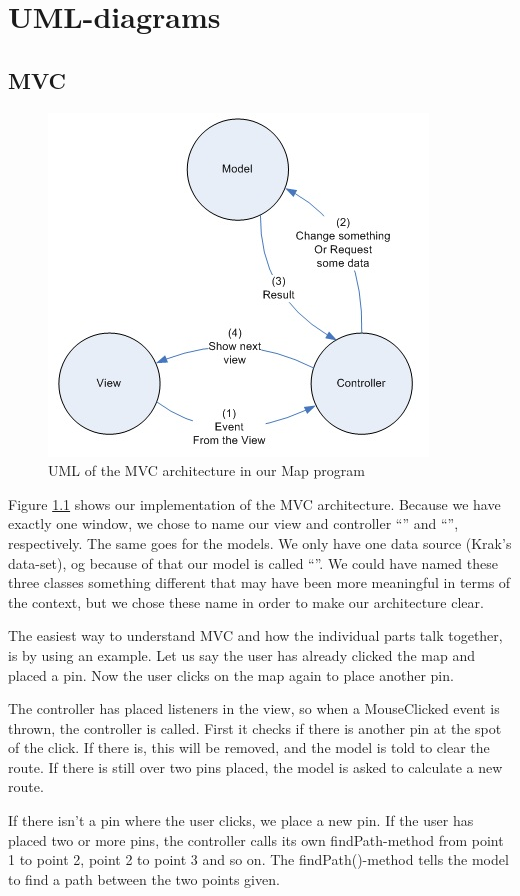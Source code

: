 \chapter{UML-diagrams}
\label{UML}

\section{MVC}
\label{UML-MVC}
\begin{figure}[h!]
\centering
\includegraphics[width=0.5\linewidth]{images/mvc}
\caption{UML of the MVC architecture in our Map program}
\label{mvc-map}
\end{figure}

Figure \ref{mvc-map} shows our implementation of the MVC architecture. Because we 
have exactly one window, we chose to name our view and controller
``'' and ``'', respectively. The same goes for the
models. We only have one data source (Krak's data-set), og because of that our model is called ``''. We
could have named these three classes something different that may have been more meaningful in
terms of the  context, but we chose these name in order to
make our architecture clear.

The easiest way to understand MVC and how the individual parts talk together, is by 
using an example. Let us say the user has already clicked the map and placed a
pin. Now the user clicks on the map again to place another pin.

The controller has placed listeners in the view, so when a MouseClicked event is
thrown, the controller is called. First it checks if there is another pin at the
spot of the click. If there is, this will be removed, and the model is told to
clear the route. If there is still over two pins placed, the model is asked to
calculate a new route.

If there isn't a pin where the user clicks, we place a new pin. If the user has
placed two or more pins, the controller calls its own findPath-method from point
1 to point 2, point 2 to point 3 and so on. The findPath()-method tells the
model to find a path between the two points given.

